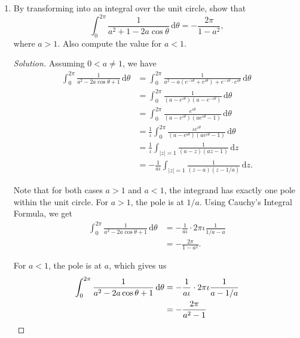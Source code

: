 \documentclass[11pt]{article}
\theoremstyle{definition}
\newenvironment{soln}{\begin{proof}[Solution]}{\end{proof}}
\begin{document}
\begin{enumerate}[leftmargin=*]
    \item By transforming into an integral over the unit circle, show that
    \[
        \int_0^{2\pi} \frac{1}{a^2 + 1 - 2a\cos\theta} \, \mathrm{d}\theta = -\frac{2\pi}{1-a^2},
    \]
    where $a > 1$. Also compute the value for $a < 1$.
    
    \begin{soln}
        Assuming $0 < a \neq 1$, we have
        \begin{align*}
            \int_0^{2\pi} \frac{1}{a^2 - 2a\cos\theta + 1} \, \mathrm{d}\theta &= \int_0^{2\pi} \frac{1}{a^2 - a(e^{-\iota\theta} + e^{\iota\theta}) + e^{-\iota\theta}\cdot e^{\iota\theta}} \, \mathrm{d}\theta \\
            &= \int_0^{2\pi} \frac{1}{(a-e^{\iota\theta})(a-e^{-\iota\theta})} \, \mathrm{d}\theta \\
            &= \int_0^{2\pi} \frac{e^{\iota\theta}}{(a-e^{\iota\theta})(ae^{\iota\theta}-1)} \, \mathrm{d}\theta \\
            &= \frac{1}{\iota} \int_0^{2\pi} \frac{\iota e^{\iota\theta}}{(a-e^{\iota\theta})(ae^{\iota\theta}-1)} \, \mathrm{d}\theta \\
            &= \frac{1}{\iota} \int_{\lvert z \rvert = 1} \frac{1}{(a-z)(az-1)} \, \mathrm{d}z \\
            &= -\frac{1}{a\iota} \int_{\lvert z \rvert = 1} \frac{1}{(z-a)(z-1/a)} \, \mathrm{d}z.
        \end{align*}
    
    
    Note that for both cases $a > 1$ and $a < 1$, the integrand has exactly one pole within the unit circle. For $a > 1$, the pole is at $1/a$. Using Cauchy's Integral Formula, we get
    \begin{align*}
        \int_0^{2\pi} \frac{1}{a^2 - 2a\cos\theta + 1} \, \mathrm{d}\theta &= -\frac{1}{a\iota} \cdot 2\pi\iota \frac{1}{1/a - a} \\
        &= -\frac{2\pi}{1-a^2}.
    \end{align*}
    
    For $a < 1$, the pole is at $a$, which gives us
    \begin{align*}
        \int_0^{2\pi} \frac{1}{a^2 - 2a\cos\theta + 1} \, \mathrm{d}\theta &= -\frac{1}{a\iota} \cdot 2\pi\iota \frac{1}{a-1/a} \\
        &= -\frac{2\pi}{a^2 - 1} \qedhere
    \end{align*}
    
    \end{soln}
    

\end{enumerate}
\end{document}
